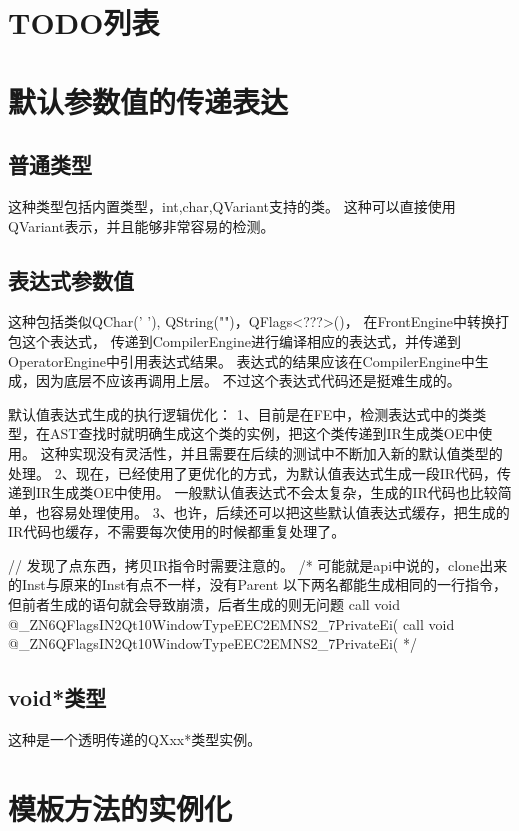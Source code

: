 \section{TODO列表}


\section{默认参数值的传递表达}
\subsection{普通类型}
这种类型包括内置类型，int,char,QVariant支持的类。
这种可以直接使用QVariant表示，并且能够非常容易的检测。

\subsection{表达式参数值}
这种包括类似QChar(' '), QString("")，QFlags<???>()，
在FrontEngine中转换打包这个表达式，
传递到CompilerEngine进行编译相应的表达式，并传递到OperatorEngine中引用表达式结果。
表达式的结果应该在CompilerEngine中生成，因为底层不应该再调用上层。
不过这个表达式代码还是挺难生成的。

默认值表达式生成的执行逻辑优化：
1、目前是在FE中，检测表达式中的类类型，在AST查找时就明确生成这个类的实例，把这个类传递到IR生成类OE中使用。
这种实现没有灵活性，并且需要在后续的测试中不断加入新的默认值类型的处理。
2、现在，已经使用了更优化的方式，为默认值表达式生成一段IR代码，传递到IR生成类OE中使用。
一般默认值表达式不会太复杂，生成的IR代码也比较简单，也容易处理使用。
3、也许，后续还可以把这些默认值表达式缓存，把生成的IR代码也缓存，不需要每次使用的时候都重复处理了。

// 发现了点东西，拷贝IR指令时需要注意的。
/*
  可能就是api中说的，clone出来的Inst与原来的Inst有点不一样，没有Parent
  以下两名都能生成相同的一行指令，但前者生成的语句就会导致崩溃，后者生成的则无问题
  call void @_ZN6QFlagsIN2Qt10WindowTypeEEC2EMNS2_7PrivateEi(%
  call void @_ZN6QFlagsIN2Qt10WindowTypeEEC2EMNS2_7PrivateEi(%
*/


\subsection{void*类型}
这种是一个透明传递的QXxx*类型实例。

\section{模板方法的实例化}
